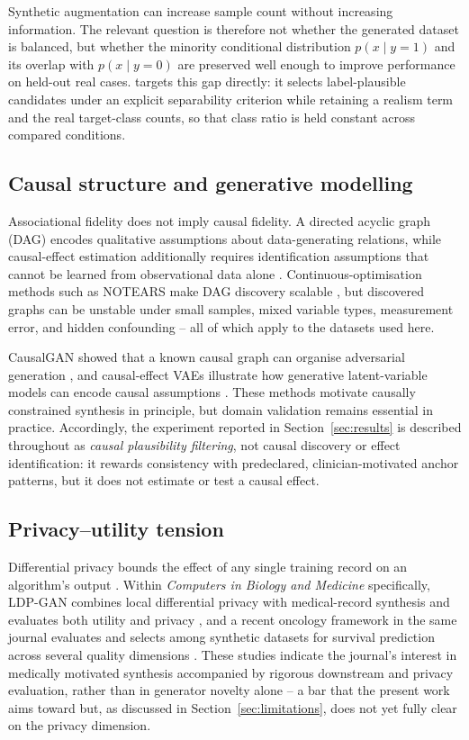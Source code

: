 Synthetic augmentation can increase sample count without increasing information. The relevant question is therefore not whether the generated dataset is balanced, but whether the minority conditional distribution $p(x\mid y=1)$ and its overlap with $p(x\mid y=0)$ are preserved well enough to improve performance on held-out real cases. \sepa{} targets this gap directly: it selects label-plausible candidates under an explicit separability criterion while retaining a realism term and the real target-class counts, so that class ratio is held constant across compared conditions.

\subsection{Causal structure and generative modelling}

Associational fidelity does not imply causal fidelity. A directed acyclic graph (DAG) encodes qualitative assumptions about data-generating relations, while causal-effect estimation additionally requires identification assumptions that cannot be learned from observational data alone \citep{pearl2009,spirtes2000}. Continuous-optimisation methods such as NOTEARS make DAG discovery scalable \citep{zheng2018}, but discovered graphs can be unstable under small samples, mixed variable types, measurement error, and hidden confounding -- all of which apply to the datasets used here.

CausalGAN showed that a known causal graph can organise adversarial generation \citep{kocaoglu2018}, and causal-effect VAEs illustrate how generative latent-variable models can encode causal assumptions \citep{louizos2017}. These methods motivate causally constrained synthesis in principle, but domain validation remains essential in practice. Accordingly, the \dacpf{} experiment reported in Section~\ref{sec:results} is described throughout as \emph{causal plausibility filtering}, not causal discovery or effect identification: it rewards consistency with predeclared, clinician-motivated anchor patterns, but it does not estimate or test a causal effect.

\subsection{Privacy--utility tension}

Differential privacy bounds the effect of any single training record on an algorithm's output \citep{dwork2006}. Within \emph{Computers in Biology and Medicine} specifically, LDP-GAN combines local differential privacy with medical-record synthesis and evaluates both utility and privacy \citep{kim2024ldpgan}, and a recent oncology framework in the same journal evaluates and selects among synthetic datasets for survival prediction across several quality dimensions \citep{christoforou2025}. These studies indicate the journal's interest in medically motivated synthesis accompanied by rigorous downstream and privacy evaluation, rather than in generator novelty alone -- a bar that the present work aims toward but, as discussed in Section~\ref{sec:limitations}, does not yet fully clear on the privacy dimension.

